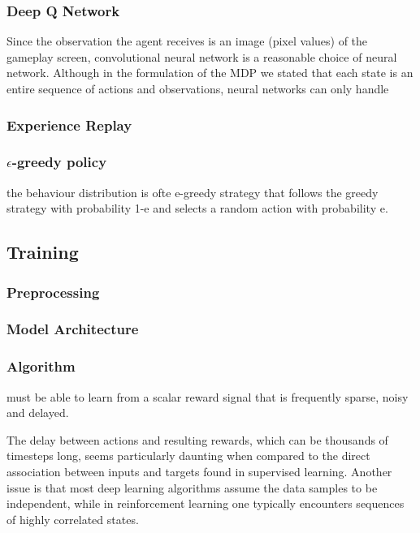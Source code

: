 \documentclass{article}
\begin{document}
\begin{multicols}{2}
\subsubsection{Deep Q Network}

Since the observation the agent receives is an image (pixel values) of the gameplay screen, convolutional neural network is a reasonable choice of neural network. Although in the formulation of the MDP we stated that each state is an entire sequence of actions and observations, neural networks can only handle

\subsubsection{Experience Replay}

\subsubsection{$\epsilon$-greedy policy}

the behaviour distribution is ofte e-greedy strategy that follows the greedy strategy with probability 1-e and selects a random action with probability e.


\subsection{Training}

\subsubsection{Preprocessing}

\subsubsection{Model Architecture}

\subsubsection{Algorithm}

must be able to learn from a scalar reward signal that is frequently sparse, noisy and delayed.

The delay between actions and resulting rewards, which can be thousands of timesteps long, seems particularly daunting when compared to the direct association between inputs and targets found in supervised learning. Another issue is that most deep learning algorithms assume the data samples to be independent, while in reinforcement learning one typically encounters sequences of highly correlated states.



\end{multicols}
\end{document}
